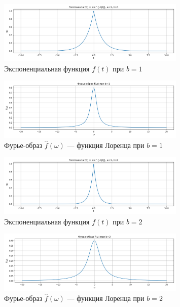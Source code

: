 \begin{figure}[H]
    \centering
    \includegraphics[width=0.8\textwidth]{python/exp_function_b1.png}
    \caption{Экспоненциальная функция $f(t)$ при $b = 1$}
\end{figure}

\begin{figure}[H]
    \centering
    \includegraphics[width=0.8\textwidth]{python/exp_fourier_b1.png}
    \caption{Фурье-образ $\hat{f}(\omega)$ — функция Лоренца при $b = 1$}
\end{figure}

\begin{figure}[H]
    \centering
    \includegraphics[width=0.8\textwidth]{python/exp_function_b2.png}
    \caption{Экспоненциальная функция $f(t)$ при $b = 2$}
\end{figure}

\begin{figure}[H]
    \centering
    \includegraphics[width=0.8\textwidth]{python/exp_fourier_b2.png}
    \caption{Фурье-образ $\hat{f}(\omega)$ — функция Лоренца при $b = 2$}
\end{figure}

